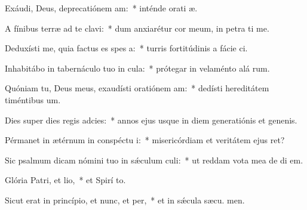 \item Exáudi, Deus, deprecatiónem am:~* inténde orati æ.
\item A fínibus terræ ad te clavi:~* dum anxiarétur cor meum, in petra ti me.
\item Deduxísti me, quia factus es spes a:~* turris fortitúdinis a fácie ci.
\item Inhabitábo in tabernáculo tuo in cula:~* prótegar in velaménto alá rum.
\item Quóniam tu, Deus meus, exaudísti oratiónem am:~* dedísti hereditátem timéntibus  um.
\item Dies super dies regis adcies:~* annos ejus usque in diem generatiónis et genenis.
\item Pérmanet in ætérnum in conspéctu i:~* misericórdiam et veritátem ejus  ret?
\item Sic psalmum dicam nómini tuo in sǽculum culi:~* ut reddam vota mea de di  em.
\item Glória Patri, et lio,~* et Spirí to.
\item Sicut erat in princípio, et nunc, et per,~* et in sǽcula sæcu. men.
